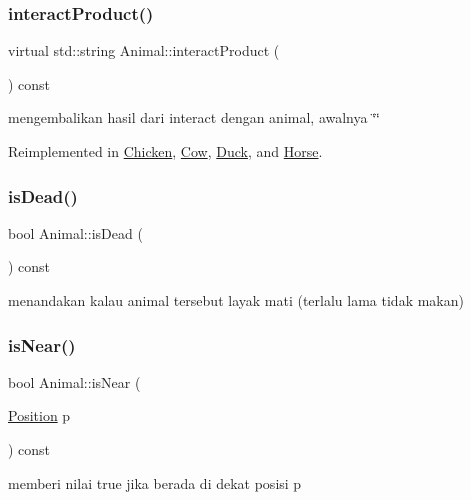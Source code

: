\subsubsection{\texorpdfstring{interactProduct()}{interactProduct()}}
{\footnotesize\ttfamily virtual std\+::string Animal\+::interact\+Product (\begin{DoxyParamCaption}{ }\end{DoxyParamCaption}) const\hspace{0.3cm}{\ttfamily [virtual]}}

mengembalikan hasil dari interact dengan animal, awalnya \char`\"{}\char`\"{} 

Reimplemented in \mbox{\hyperlink{class_chicken_abfe91af373fe0e1183cfb52f8ab4b4a0}{Chicken}}, \mbox{\hyperlink{class_cow_aceeee175e5611b3c963dc3000991eaeb}{Cow}}, \mbox{\hyperlink{class_duck_a38e775e1f4ab667eeb997fb36837b456}{Duck}}, and \mbox{\hyperlink{class_horse_aa6ff6a5a2cb301ccc853cf3c939ee070}{Horse}}.

\mbox{\label{class_animal_a4695446ddbce3ae05bc1d43301b6a3ff}} 
\subsubsection{\texorpdfstring{isDead()}{isDead()}}
{\footnotesize\ttfamily bool Animal\+::is\+Dead (\begin{DoxyParamCaption}{ }\end{DoxyParamCaption}) const}

menandakan kalau animal tersebut layak mati (terlalu lama tidak makan) \mbox{\label{class_animal_a70b1c6a9b76c5dee3d9ecdb8410f6e56}} 
\subsubsection{\texorpdfstring{isNear()}{isNear()}}
{\footnotesize\ttfamily bool Animal\+::is\+Near (\begin{DoxyParamCaption}\item[{\mbox{\hyperlink{class_position}{Position}}}]{p }\end{DoxyParamCaption}) const}

memberi nilai true jika berada di dekat posisi p \mbox{\label{class_animal_a183837eb1eefbcf853012a62c707e8b6}} 
